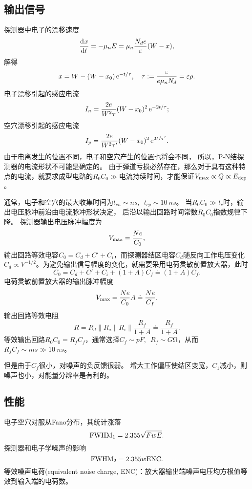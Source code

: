 \subsection{输出信号}

探测器中电子的漂移速度
\[
	\frac{\mathrm{d}^{{}}x}{\mathrm{d}{t}^{{}}}=-\mu_nE=\mu_n\frac{N_de}\varepsilon(W-x),
\]
解得
\begin{align}
	x=W-(W-x_0)\mathop{}\!\mathrm{e}^{-t/\tau},\quad\tau:=\frac\varepsilon{e\mu_nN_d}=\varepsilon\rho.
\end{align}
电子漂移引起的感应电流
\[
	I_n=\frac{2e}{W^2\tau}(W-x_0)^2\mathop{}\!\mathrm{e}^{-2t/\tau};
\]
空穴漂移引起的感应电流
\[
	I_p=\frac{2e}{W^2\tau'}(W-x_0)^2\e{2t/\tau'}.%
\]
由于电离发生的位置不同，电子和空穴产生的位置也将会不同，%
所以，P-N结探测器的电流形状不可能是确定的。
由于弹道亏损必然存在，那么对于具有这种特点的电流，就要求成型电路的$R_0C_0\gg$电流持续时间，才能保证$V_\mathrm{max}\propto Q\propto E_{\mathrm{dep}}$。

通常，电子和空穴的最大收集时间为$t_{cn}\sim\si{ns},\enspace t_{cp}\sim\SI{10}{ns}$。
当$R_0C_0\gg t_c$时，输出电压脉冲前沿由电流脉冲形状决定，
后沿以输出回路时间常数$R_0C_0$指数规律下降。
探测器输出电压脉冲幅度为
\[
	V_\mathrm{max}=\frac{Ne}{C_0},
\]
输出回路等效电容$C_0=C_d+C'+C_i$，而探测器结区电容$C_d$随反向工作电压变化$C_d\propto V^{-1/2}$。为避免输出信号幅度的变化，就需要采用电荷灵敏前置放大器，此时
\[
	C_0=C_d+C'+C_i+(1+A)C_f\doteq(1+A)C_f.
\]
电荷灵敏前置放大器的输出脉冲幅度
\begin{align}
	V_\mathrm{max}=\frac{Ne}{C_0}A\doteq\frac{Ne}{C_f}.
\end{align}
输出回路等效电阻
\[
	R=R_d\parallel R_a\parallel R_i\parallel\frac{R_f}{1+A}\doteq\frac{R_f}{1+A}.
\]
等效输出回路$R_0C_0=R_fC_f$，通常选择$C_f\sim\si{pF},\enspace R_f\sim\si{G\ohm}$，从而$R_fC_f\sim\si{ms}\gg\SI{10}{ns}$。

但是由于$C_f$很小，对噪声的负反馈很弱。%
增大工作偏压使结区变宽，$C_1$减小，则噪声也小，对能量分辨率是有利的。

\subsection{性能}

电子空穴对服从Fano分布，其统计涨落
\[
	\mathrm{FWHM}_1=2.355\sqrt{FwE}.
\]
探测器和电子学噪声的影响
\[
	\mathrm{FWHM}_2=2.355w\mathrm{ENC}.
\]
等效噪声电荷(equivalent noise charge, ENC)：放大器输出端噪声电压均方根值等效到输入端的电荷数。

